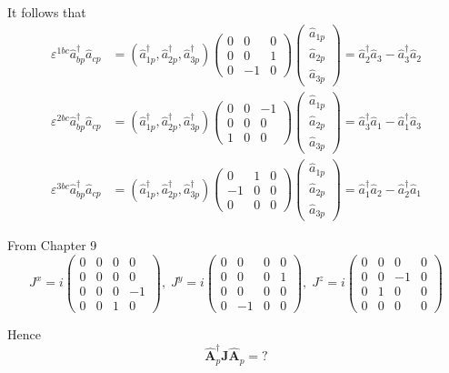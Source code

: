 \documentclass[12pt]{article}
\begin{document}
It follows that
\begin{align*}
\varepsilon^{1bc}\hat a_{bp}^\dag\hat a_{cp}
&=(\hat a_{1p}^\dag,\hat a_{2p}^\dag,\hat a_{3p}^\dag)
\begin{pmatrix}
0&0&0
\\
0&0&1
\\
0&-1&0
\end{pmatrix}
\begin{pmatrix}\hat a_{1p}\\\hat a_{2p}\\\hat a_{3p}\end{pmatrix}
=\hat a_2^\dag\hat a_3-\hat a_3^\dag\hat a_2
\\
\varepsilon^{2bc}\hat a_{bp}^\dag\hat a_{cp}
&=(\hat a_{1p}^\dag,\hat a_{2p}^\dag,\hat a_{3p}^\dag)
\begin{pmatrix}
0&0&-1
\\
0&0&0
\\
1&0&0
\end{pmatrix}
\begin{pmatrix}\hat a_{1p}\\\hat a_{2p}\\\hat a_{3p}\end{pmatrix}
=\hat a_3^\dag\hat a_1-\hat a_1^\dag\hat a_3
\\
\varepsilon^{3bc}\hat a_{bp}^\dag\hat a_{cp}
&=(\hat a_{1p}^\dag,\hat a_{2p}^\dag,\hat a_{3p}^\dag)
\begin{pmatrix}
0&1&0
\\
-1&0&0
\\
0&0&0
\end{pmatrix}
\begin{pmatrix}\hat a_{1p}\\\hat a_{2p}\\\hat a_{3p}\end{pmatrix}
=\hat a_1^\dag\hat a_2-\hat a_2^\dag\hat a_1
\end{align*}

From Chapter 9
\begin{equation*}
J^x=i\begin{pmatrix}
0&0&0&0
\\
0&0&0&0
\\
0&0&0&-1
\\
0&0&1&0
\end{pmatrix},
\;
J^y=i\begin{pmatrix}
0&0&0&0
\\
0&0&0&1
\\
0&0&0&0
\\
0&-1&0&0
\end{pmatrix},
\;
J^z=i\begin{pmatrix}
0&0&0&0
\\
0&0&-1&0
\\
0&1&0&0
\\
0&0&0&0
\end{pmatrix}
\end{equation*}

Hence
\begin{equation*}
\hat{\mathbf A}_p^\dag\mathbf J\hat{\mathbf A}_p=?
\end{equation*}
\end{document}
